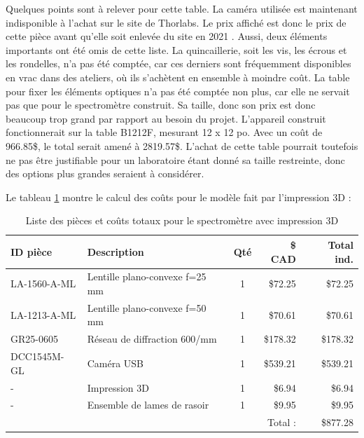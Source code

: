 \documentclass[11pt,letterpaper]{article}
\begin{document}
Quelques points sont à relever pour cette table. La caméra utilisée est maintenant indisponible
à l'achat sur le site de Thorlabs. Le prix affiché est donc le prix de cette pièce avant
qu'elle soit enlevée du site en 2021 \cite{noauthor_thorlabs_2021}. Aussi, deux éléments importants
ont été omis de cette liste. La quincaillerie, soit les vis, les écrous et les 
rondelles, n'a pas été comptée, car ces derniers sont fréquemment disponibles en vrac dans
des ateliers, où ils s'achètent en ensemble à moindre coût. La table pour fixer les éléments 
optiques n'a pas été comptée non plus, car elle ne servait pas que pour le spectromètre 
construit. Sa taille, donc son prix est donc beaucoup trop grand par rapport au besoin du projet. L'appareil
construit fonctionnerait sur la table B1212F, mesurant 12 x 12 po. Avec un coût de 966.85\$,
le total serait amené à 2819.57\$. L'achat de cette table pourrait toutefois ne pas être 
justifiable pour un laboratoire étant donné sa taille restreinte, donc des options plus grandes
seraient à considérer.


Le tableau \ref{prix_3D} montre le calcul des coûts pour le modèle fait par l'impression 3D :

\begin{table}[!ht]
    \centering
    \caption{Liste des pièces et coûts totaux pour le spectromètre avec impression 3D \cite{noauthor_thorlabs_2024} \cite{noauthor_razor_2024}}
    \begin{tabular}{|l|l|c|r|r|}
    \hline
        ID pièce & Description & Qté & \$ CAD & Total ind. \\ \hline\hline
        LA-1560-A-ML & Lentille plano-convexe f=25 mm & 1 & \$72.25 & \$72.25 \\ \hline
        LA-1213-A-ML & Lentille plano-convexe f=50 mm & 1 & \$70.61 & \$70.61 \\ \hline
        GR25-0605 & Réseau de diffraction 600/mm & 1 & \$178.32 & \$178.32 \\ \hline
        DCC1545M-GL & Caméra USB & 1 & \$539.21 & \$539.21 \\ \hline
        - & Impression 3D & 1 & \$6.94 & \$6.94 \\ \hline
        - & Ensemble de lames de rasoir & 1 & \$9.95 & \$9.95 \\ \hline\hline
        ~ & ~ & ~ & Total : & \$877.28 \\ \hline
    \end{tabular}
    \label{prix_3D}
\end{table}
\end{document}
